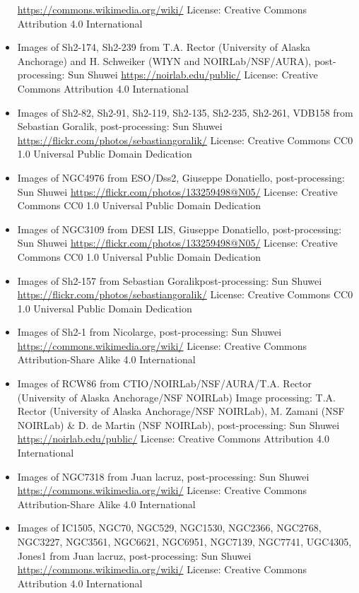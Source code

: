 \begin{itemize}
	 \url{https://commons.wikimedia.org/wiki/}
	 License: Creative Commons Attribution 4.0 International
\item Images of Sh2-174, Sh2-239
	 from T.A. Rector (University of Alaska Anchorage) and H. Schweiker (WIYN and NOIRLab/NSF/AURA), post-processing: Sun Shuwei
	 \url{https://noirlab.edu/public/}
	 License: Creative Commons Attribution 4.0 International
\item Images of Sh2-82, Sh2-91, Sh2-119, Sh2-135, Sh2-235, Sh2-261, VDB158
	 from Sebastian Goralik, post-processing: Sun Shuwei
	 \url{https://flickr.com/photos/sebastiangoralik/}
	 License: Creative Commons CC0 1.0 Universal Public Domain Dedication
\item Images of NGC4976
	 from ESO/Dss2, Giuseppe Donatiello, post-processing: Sun Shuwei
	 \url{https://flickr.com/photos/133259498@N05/}
	 License: Creative Commons CC0 1.0 Universal Public Domain Dedication
\item Images of NGC3109
	 from DESI LIS, Giuseppe Donatiello, post-processing: Sun Shuwei
	 \url{https://flickr.com/photos/133259498@N05/}
	 License: Creative Commons CC0 1.0 Universal Public Domain Dedication
\item Images of Sh2-157
	 from Sebastian Goralikpost-processing: Sun Shuwei
	 \url{https://flickr.com/photos/sebastiangoralik/}
	 License: Creative Commons CC0 1.0 Universal Public Domain Dedication
\item Images of Sh2-1
	 from Nicolarge, post-processing: Sun Shuwei
	 \url{https://commons.wikimedia.org/wiki/}
	 License: Creative Commons Attribution-Share Alike 4.0 International 
\item Images of RCW86
	 from CTIO/NOIRLab/NSF/AURA/T.A. Rector (University of Alaska Anchorage/NSF NOIRLab) Image processing: T.A. Rector (University of Alaska Anchorage/NSF NOIRLab), M. Zamani (NSF NOIRLab) \& D. de Martin (NSF NOIRLab), post-processing: Sun Shuwei
	 \url{https://noirlab.edu/public/}
	 License: Creative Commons Attribution 4.0 International
\item Images of NGC7318
	 from Juan lacruz, post-processing: Sun Shuwei
	 \url{https://commons.wikimedia.org/wiki/}
	 License: Creative Commons Attribution-Share Alike 4.0 International 
\item Images of IC1505, NGC70, NGC529, NGC1530, NGC2366, NGC2768, NGC3227, NGC3561,
	 NGC6621, NGC6951, NGC7139, NGC7741, UGC4305, Jones1
	 from Juan lacruz, post-processing: Sun Shuwei
	 \url{https://commons.wikimedia.org/wiki/}
	 License: Creative Commons Attribution 4.0 International

\end{itemize}
